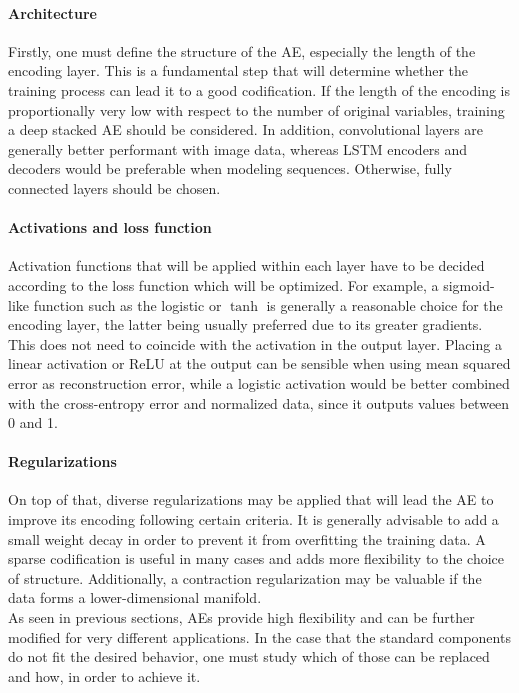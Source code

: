 \paragraph{Architecture} Firstly, one must define the structure of the AE, especially the length of the encoding layer. This is a fundamental step that will determine whether the training process can lead it to a good codification. If the length of the encoding is proportionally very low with respect to the number of original variables, training a deep stacked AE should be considered. In addition, convolutional layers are generally better performant with image data, whereas LSTM encoders and decoders would be preferable when modeling sequences. Otherwise, fully connected layers should be chosen. 

\paragraph{Activations and loss function} Activation functions that will be applied within each layer have to be decided according to the loss function which will be optimized. For example, a sigmoid-like function such as the logistic or $\tanh$ is generally a reasonable choice for the encoding layer, the latter being usually preferred due to its greater gradients. This does not need to coincide with the activation in the output layer. Placing a linear activation or ReLU at the output can be sensible when using mean squared error as reconstruction error, while a logistic activation would be better combined with the cross-entropy error and normalized data, since it outputs values between 0 and 1.

\paragraph{Regularizations} On top of that, diverse regularizations may be applied that will lead the AE to improve its encoding following certain criteria. It is generally advisable to add a small weight decay in order to prevent it from overfitting the training data. A sparse codification is useful in many cases and adds more flexibility to the choice of structure. Additionally, a contraction regularization may be valuable if the data forms a lower-dimensional manifold. \\

As seen in previous sections, AEs provide high flexibility and can be further modified for very different applications. In the case that the standard components do not fit the desired behavior, one must study which of those can be replaced and how, in order to achieve it.

